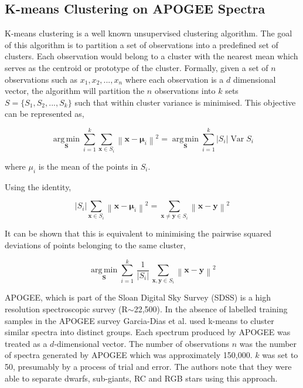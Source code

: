 \subsection{K-means Clustering on APOGEE Spectra}

K-means clustering is a well known unsupervised clustering algorithm. The goal of this algorithm is to partition a set of observations into a predefined set of clusters. Each observation would belong to a cluster with the nearest mean which serves as the centroid or prototype of the cluster\cite{macqueen1967some}. Formally, given a set of $n$ observations such as \(x_1,x_2,...,x_n\) where each observation is a $d$ dimensional vector, the algorithm will partition the $n$ observations into $k$ sets $S=\{S_1,S_2,...,S_k\}$ such that within cluster variance is minimised. This objective can be represented as,

\begin{equation}
{\underset {\mathbf {S} }{\operatorname {arg\,min} }}\sum _{i=1}^{k}\sum _{\mathbf {x} \in S_{i}}\left\|\mathbf {x} -{\boldsymbol {\mu }}_{i}\right\|^{2}={\underset {\mathbf {S} }{\operatorname {arg\,min} }}\sum _{i=1}^{k}|S_{i}|\operatorname {Var} S_{i}
\end{equation}

where $\mu_i$ is the mean of the points in $S_i$. 

Using the identity,

\begin{equation}
    |S_{i}|\sum _{\mathbf {x} \in S_{i}}\left\|\mathbf {x} -{\boldsymbol {\mu }}_{i}\right\|^{2}=\sum _{\mathbf {x} \neq \mathbf {y} \in S_{i}}\left\|\mathbf {x} -\mathbf {y} \right\|^{2}
\end{equation}

It can be shown that this is equivalent to minimising the pairwise squared deviations of points belonging to the same cluster,

\begin{equation}
{\underset {\mathbf {S} }{\operatorname {arg\,min} }}\sum _{i=1}^{k}\,{\frac {1}{|S_{i}|}}\,\sum _{\mathbf {x} ,\mathbf {y} \in S_{i}}\left\|\mathbf {x} -\mathbf {y} \right\|^{2}
\end{equation}

APOGEE, which is part of the Sloan Digital Sky Survey (SDSS) is a high resolution spectroscopic survey (R$\sim$22,500)\cite{eisenstein2001spectroscopic}\cite{blanton2017sloan}. In the absence of labelled training samples in the APOGEE survey Garcia-Dias et al. used k-means to cluster similar spectra into distinct groups\cite{garcia2018machine}. Each spectrum produced by APOGEE was treated as a $d$-dimensional vector. The number of observations $n$ was the number of spectra generated by APOGEE which was approximately 150,000. $k$ was set to 50, presumably by a process of trial and error. The authors note that they were able to separate dwarfs, sub-giants, RC and RGB stars using this approach. 

